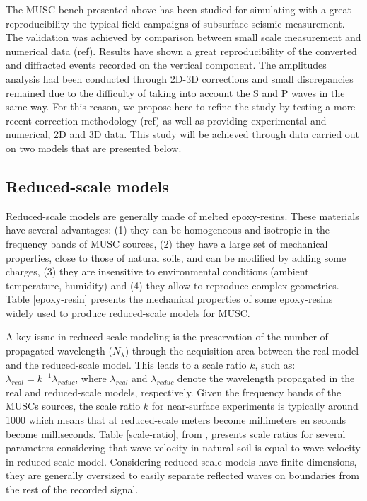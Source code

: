 \documentclass[manuscript,revised]{geophysics}
\begin{document}
\noindent The MUSC bench presented above has been studied for simulating with a great reproducibility the typical field campaigns of subsurface seismic measurement. The validation was achieved by comparison between small scale measurement and numerical data (ref). Results have shown a great reproducibility of the converted and diffracted events recorded on the vertical component. The amplitudes analysis had been conducted through 2D-3D corrections and small discrepancies remained due to the difficulty of taking into account the S and P waves in the same way. For this reason, we propose here to refine the study by testing a more recent correction methodology (ref) as well as providing experimental and numerical, 2D and 3D data. This study will be achieved through data carried out on two models that are presented below.


\subsection{Reduced-scale models}

\noindent Reduced-scale models are generally made of melted epoxy-resins. These materials have several advantages: (1) they can be homogeneous and isotropic in the frequency bands of MUSC sources, (2) they have a large set of mechanical properties, close to those of natural soils, and can be modified by adding some charges, (3) they are insensitive to environmental conditions (ambient temperature, humidity) and (4) they allow to reproduce complex geometries. Table \ref{epoxy-resin} presents the mechanical properties of some epoxy-resins widely used to produce reduced-scale models for MUSC.

\noindent A key issue in reduced-scale modeling is the preservation of the number of propagated wavelength ($N_{\lambda}$) through the acquisition area between the real model and the reduced-scale model. This leads to a scale ratio $k$, such as: $\lambda_{real}=k^{-1}\lambda_{reduc}$, where $\lambda_{real}$ and $\lambda_{reduc}$ denote the wavelength propagated in the real and reduced-scale models, respectively. Given the frequency bands of the MUSCs sources, the scale ratio $k$ for near-surface experiments is typically around 1000 which means that at reduced-scale meters become millimeters en seconds become milliseconds. Table \ref{scale-ratio}, from \citet{Bretaudeau_SSM_2011}, presents scale ratios for several parameters considering that wave-velocity in natural soil is equal to wave-velocity in reduced-scale model. Considering reduced-scale models have finite dimensions, they are generally oversized to easily separate reflected waves on boundaries from the rest of the recorded signal. 
\end{document}
